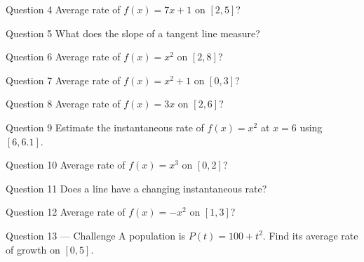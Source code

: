 \documentclass[11pt]{article}
\begin{document}
\begin{qbox}{Question 4}
Average rate of $f(x)=7x+1$ on $[2,5]$?\workspace{2.4cm}
\end{qbox}

\begin{qbox}{Question 5}
What does the slope of a tangent line measure?\workspace{2.4cm}
\end{qbox}

\begin{qbox}{Question 6}
Average rate of $f(x)=x^2$ on $[2,8]$?\workspace{2.4cm}
\end{qbox}

\begin{qbox}{Question 7}
Average rate of $f(x)=x^2+1$ on $[0,3]$?\workspace{2.4cm}
\end{qbox}

\begin{qbox}{Question 8}
Average rate of $f(x)=3x$ on $[2,6]$?\workspace{2.4cm}
\end{qbox}

\begin{qbox}{Question 9}
Estimate the instantaneous rate of $f(x)=x^2$ at $x=6$ using $[6,6.1]$.\workspace{2.4cm}
\end{qbox}

\begin{qbox}{Question 10}
Average rate of $f(x)=x^3$ on $[0,2]$?\workspace{2.4cm}
\end{qbox}

\begin{qbox}{Question 11}
Does a line have a changing instantaneous rate?\workspace{2.4cm}
\end{qbox}

\begin{qbox}{Question 12}
Average rate of $f(x)=-x^2$ on $[1,3]$?\workspace{2.4cm}
\end{qbox}

\begin{qbox}{Question 13 --- Challenge}
A population is $P(t)=100+t^2$. Find its average rate of growth on $[0,5]$.\workspace{3cm}
\end{qbox}

\clearpage
{}
\end{document}
